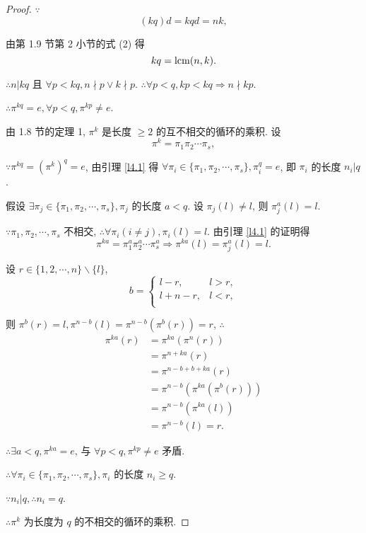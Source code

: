 \documentclass[color=black,device=normal,lang=cn,mode=geye]{elegantnote}
\begin{document}
\begin{proof}
    $\because$
    \[(kq)d=kqd=nk,\]

    由第 1.9 节第 2 小节的式 (2) 得
    \[kq=\operatorname{lcm} (n,k).\]

    $\therefore n|kq$ 且 $\forall p<kq,n\nmid p\vee k\nmid p$. $\therefore\forall p<q,kp<kq\Rightarrow n\nmid kp$.
    
    $\therefore\pi^{kq}=e,\forall p<q,\pi^{kp}\neq e$.

    由 1.8 节的定理 1, $\pi^k$ 是长度 $\geq2$ 的互不相交的循环的乘积. 设
    \[\pi^k=\pi_1\pi_2\cdots\pi_s,\]

    $\because\pi^{kq}=(\pi^k)^q=e$, 由引理 \ref{l4.1} 得 $\forall\pi_i\in\{\pi_1,\pi_2,\cdots,\pi_s\},\pi_i^q=e$, 即 $\pi_i$ 的长度 $n_i|q$.

    假设 $\exists\pi_j\in\{\pi_1,\pi_2,\cdots,\pi_s\},\pi_j$ 的长度 $a<q$. 设 $\pi_j(l)\neq l$, 则 $\pi_j^a(l)=l$.

    $\because\pi_1,\pi_2,\cdots,\pi_s$ 不相交, $\therefore\forall\pi_i(i\neq j),\pi_i(l)=l$. 由引理 \ref{l4.1} 的证明得
    \[\pi^{ka}=\pi_1^a\pi_2^a\cdots\pi_s^a\Rightarrow\pi^{ka}(l)=\pi_j^a(l)=l.\]

    设 $r\in\{1,2,\cdots,n\}\backslash\{l\}$,
    \[b=\begin{cases}
        l-r, & l>r, \\
        l+n-r, & l<r, \\
    \end{cases}\]

    则 $\pi^b(r)=l,\pi^{n-b}(l)=\pi^{n-b}(\pi^b(r))=r$, $\therefore$
    \begin{align*}
        \pi^{ka}(r) & =\pi^{ka}(\pi^{n}(r)) \\
        & =\pi^{n+ka}(r) \\
        & =\pi^{n-b+b+ka}(r) \\
        & =\pi^{n-b}(\pi^{ka}(\pi^b(r))) \\
        & =\pi^{n-b}(\pi^{ka}(l)) \\
        & =\pi^{n-b}(l)=r.
    \end{align*}

    $\therefore\exists a<q,\pi^{ka}=e$, 与 $\forall p<q,\pi^{kp}\neq e$ 矛盾.

    $\therefore\forall\pi_i\in\{\pi_1,\pi_2,\cdots,\pi_s\},\pi_i$ 的长度 $n_i\geq q$.

    $\because n_i|q,\therefore n_i=q$.

    $\therefore\pi^k$ 为长度为 $q$ 的不相交的循环的乘积.
\end{proof}
\end{document}

